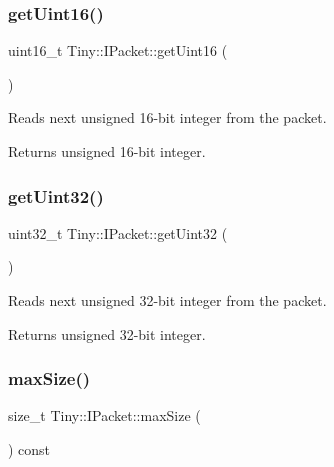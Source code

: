\subsubsection{\texorpdfstring{get\+Uint16()}{getUint16()}}
{\footnotesize\ttfamily uint16\+\_\+t Tiny\+::\+I\+Packet\+::get\+Uint16 (\begin{DoxyParamCaption}{ }\end{DoxyParamCaption})\hspace{0.3cm}{\ttfamily [inline]}}

Reads next unsigned 16-\/bit integer from the packet. \begin{DoxyReturn}{Returns}
unsigned 16-\/bit integer. 
\end{DoxyReturn}
\mbox{\label{classTiny_1_1IPacket_a0a0d3758ca0f61e3eee9d20a7142de8d}} 
\subsubsection{\texorpdfstring{get\+Uint32()}{getUint32()}}
{\footnotesize\ttfamily uint32\+\_\+t Tiny\+::\+I\+Packet\+::get\+Uint32 (\begin{DoxyParamCaption}{ }\end{DoxyParamCaption})\hspace{0.3cm}{\ttfamily [inline]}}

Reads next unsigned 32-\/bit integer from the packet. \begin{DoxyReturn}{Returns}
unsigned 32-\/bit integer. 
\end{DoxyReturn}
\mbox{\label{classTiny_1_1IPacket_a0a448d8efe2b6db3ee826f23b184b395}} 
\subsubsection{\texorpdfstring{max\+Size()}{maxSize()}}
{\footnotesize\ttfamily size\+\_\+t Tiny\+::\+I\+Packet\+::max\+Size (\begin{DoxyParamCaption}{ }\end{DoxyParamCaption}) const\hspace{0.3cm}{\ttfamily [inline]}}


